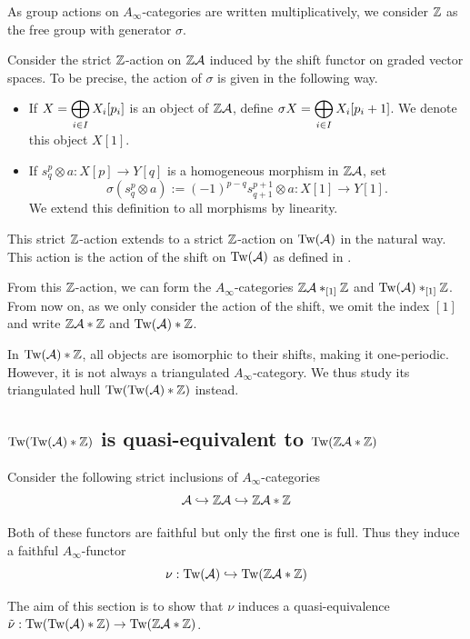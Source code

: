 \documentclass[12pt]{article}
\begin{document}
	As group actions on $A_\infty$-categories are written multiplicatively, we consider $\mathbb{Z}$ as the free group with generator $\sigma$.
	
	\begin{definition}
		\label{Ainftyaction}
		Consider the strict $\mathbb{Z}$-action on $\mathbb{Z} {\cal{A}}$ induced by the shift functor on graded vector spaces. To be precise, the action of $\sigma$ is given in the following way.
		\begin{itemize}
			\item If $X = \displaystyle\bigoplus_{i \in I} X_i[p_i]$ is an object of $\mathbb{Z} {\cal{A}}$, define $\sigma X = \displaystyle\bigoplus_{i \in I} X_i[p_i +1]$. We denote this object $X[1]$.
			\item If $s^p_q \otimes a: X[p] \to Y[q]$ is a homogeneous morphism in $\mathbb{Z} {\cal{A}}$, set 
			\[\sigma (s^p_q \otimes a):= (-1)^{p-q} s^{p+1}_{q+1} \otimes a: X[1] \to Y[1].\] 
			We extend this definition to all morphisms by linearity.
		\end{itemize}
		This strict $\mathbb{Z}$-action extends to a strict $\mathbb{Z}$-action on $\textup{Tw}({\cal{A}})$ in the natural way. This action is the action of the shift on $\textup{Tw}({\cal{A}})$ as defined in \cite[Section 3d]{Sei}.
	\end{definition}
	
	From this $\mathbb{Z}$-action, we can form the $A_\infty$-categories $\mathbb{Z} {\cal{A}} *_{[1]} \mathbb{Z}$ and $\textup{Tw}({\cal{A}}) *_{[1]} \mathbb{Z}$. From now on, as we only consider the action of the shift, we omit the index $[1]$ and write $\mathbb{Z}{\cal{A}} * \mathbb{Z}$ and $\textup{Tw}({\cal{A}}) * \mathbb{Z}$. 
	
	In $\textup{Tw}({\cal{A}}) * \mathbb{Z}$, all objects are isomorphic to their shifts, making it one-periodic. However, it is not always a triangulated $A_\infty$-category. We thus study its triangulated hull $\textup{Tw}(\textup{Tw}({\cal{A}})*\mathbb{Z})$ instead.
	
	\subsection{$\textup{Tw}(\textup{Tw}({\cal{A}}) * \mathbb{Z})$ is quasi-equivalent to $\textup{Tw}(\mathbb{Z} {\cal{A}} * \mathbb{Z})$}
	
	\noindent Consider the following strict inclusions of $A_\infty$-categories
	\[{\cal{A}} \hookrightarrow \mathbb{Z} {\cal{A}} \hookrightarrow \mathbb{Z} {\cal{A}} * \mathbb{Z}\]
	
	\noindent Both of these functors are faithful but only the first one is full. Thus they induce a faithful $A_\infty$-functor 
	\[\nu: \textup{Tw}({\cal{A}}) \hookrightarrow \textup{Tw}(\mathbb{Z} {\cal{A}} * \mathbb{Z})\]
	
	The aim of this section is to show that $\nu$ induces a quasi-equivalence $\tilde{\nu}: \textup{Tw}(\textup{Tw}({\cal{A}})* \mathbb{Z}) \to \textup{Tw}(\mathbb{Z} {\cal{A}} * \mathbb{Z})$.
	
\end{document}
